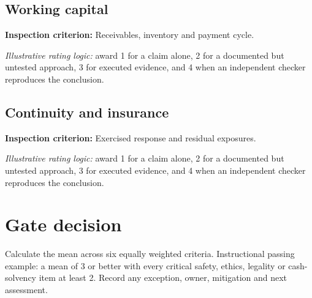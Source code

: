 \documentclass[11pt]{article}
\begin{document}
\subsection*{Working capital}
\textbf{Inspection criterion:} Receivables, inventory and payment cycle.\par\textit{Illustrative rating logic:} award 1 for a claim alone, 2 for a documented but untested approach, 3 for executed evidence, and 4 when an independent checker reproduces the conclusion.\par
\subsection*{Continuity and insurance}
\textbf{Inspection criterion:} Exercised response and residual exposures.\par\textit{Illustrative rating logic:} award 1 for a claim alone, 2 for a documented but untested approach, 3 for executed evidence, and 4 when an independent checker reproduces the conclusion.\par
\section{Gate decision}
Calculate the mean across six equally weighted criteria. Instructional passing example: a mean of 3 or better with every critical safety, ethics, legality or cash-solvency item at least 2. Record any exception, owner, mitigation and next assessment.
\end{document}

